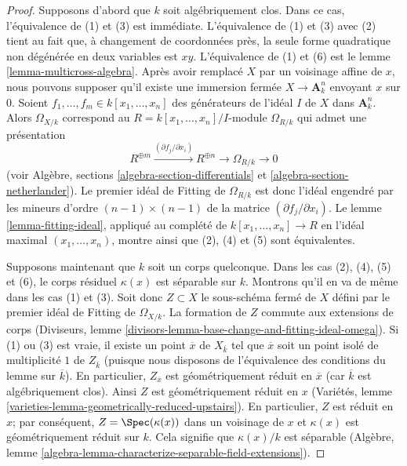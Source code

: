 \begin{proof}
Supposons d'abord que $k$ soit algébriquement clos. Dans ce cas, l'équivalence de (1) et (3) est immédiate. L'équivalence de (1) et (3) avec (2) tient au fait que, à changement de coordonnées près, la seule forme quadratique non dégénérée en deux variables est $xy$. L'équivalence de (1) et (6) est le lemme \ref{lemma-multicross-algebra}. Après avoir remplacé $X$ par un voisinage affine de $x$, nous pouvons supposer qu'il existe une immersion fermée $X \to \mathbf{A}^n_k$ envoyant $x$ sur $0$. Soient $f_1, \ldots, f_m \in k[x_1, \ldots, x_n]$ des générateurs de l'idéal $I$ de $X$ dans $\mathbf{A}^n_k$. Alors $\Omega_{X/k}$ correspond au $R = k[x_1, \ldots, x_n]/I$-module $\Omega_{R/k}$ qui admet une présentation $$
R^{\oplus m} \xrightarrow{(\partial f_j/\partial x_i)}
R^{\oplus n} \to \Omega_{R/k} \to 0
$$ (voir Algèbre, sections \ref{algebra-section-differentials} et \ref{algebra-section-netherlander}). Le premier idéal de Fitting de $\Omega_{R/k}$ est donc l'idéal engendré par les mineurs d'ordre $(n - 1) \times (n - 1)$ de la matrice $(\partial f_j/\partial x_i)$. Le lemme \ref{lemma-fitting-ideal}, appliqué au complété de $k[x_1, \ldots, x_n] \to R$ en l'idéal maximal $(x_1, \ldots, x_n)$, montre ainsi que (2), (4) et (5) sont équivalentes.

\medskip\noindent
Supposons maintenant que $k$ soit un corps quelconque. Dans les cas (2), (4), (5) et (6), le corps résiduel $\kappa(x)$ est séparable sur $k$. Montrons qu'il en va de même dans les cas (1) et (3). Soit donc $Z \subset X$ le sous-schéma fermé de $X$ défini par le premier idéal de Fitting de $\Omega_{X/k}$. La formation de $Z$ commute aux extensions de corps (Diviseurs, lemme \ref{divisors-lemma-base-change-and-fitting-ideal-omega}). Si (1) ou (3) est vraie, il existe un point $\overline{x}$ de $X_{\overline{k}}$ tel que $\overline{x}$ soit un point isolé de multiplicité $1$ de $Z_{\overline{k}}$ (puisque nous disposons de l'équivalence des conditions du lemme sur $\overline{k}$). En particulier, $Z_{\overline{x}}$ est géométriquement réduit en $\overline{x}$ (car $\overline{k}$ est algébriquement clos). Ainsi $Z$ est géométriquement réduit en $x$ (Variétés, lemme \ref{varieties-lemma-geometrically-reduced-upstairs}). En particulier, $Z$ est réduit en $x$; par conséquent, $Z = \Spec(\kappa(x))$ dans un voisinage de $x$ et $\kappa(x)$ est géométriquement réduit sur $k$. Cela signifie que $\kappa(x)/k$ est séparable (Algèbre, lemme \ref{algebra-lemma-characterize-separable-field-extensions}).


\end{proof}
